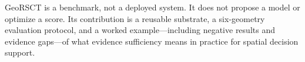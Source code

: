 GeoRSCT is a benchmark, not a deployed system. It does not propose a
model or optimize a score. Its contribution is a reusable substrate,
a six-geometry evaluation protocol, and a worked example---including
negative results and evidence gaps---of what evidence sufficiency means
in practice for spatial decision support.
